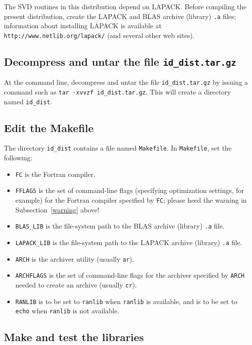 \documentclass[letterpaper,12pt]{article}
\begin{document}
The SVD routines in this distribution depend on LAPACK.
Before compiling the present distribution,
create the LAPACK and BLAS archive (library) {\tt .a} files;
information about installing LAPACK is available
at {\tt http://www.netlib.org/lapack/} (and several other web sites).


\subsection{Decompress and untar the file {\tt id\_dist.tar.gz}}

At the command line, decompress and untar the file
{\tt id\_dist.tar.gz} by issuing a command such as
{\tt tar -xvvzf id\_dist.tar.gz}.
This will create a directory named {\tt id\_dist}.


\subsection{Edit the Makefile}
\label{makefile_edit}

The directory {\tt id\_dist} contains a file named {\tt Makefile}.
In {\tt Makefile}, set the following:
%
\begin{itemize}
\item {\tt FC} is the Fortran compiler.
\item {\tt FFLAGS} is the set of command-line flags
      (specifying optimization settings, for example)
      for the Fortran compiler specified by {\tt FC};
      please heed the warning in Subsection~\ref{warning} above!
\item {\tt BLAS\_LIB} is the file-system path to the BLAS archive
      (library) {\tt .a} file.
\item {\tt LAPACK\_LIB} is the file-system path to the LAPACK archive
      (library) {\tt .a} file.
\item {\tt ARCH} is the archiver utility (usually {\tt ar}).
\item {\tt ARCHFLAGS} is the set of command-line flags
      for the archiver specified by {\tt ARCH} needed
      to create an archive (usually {\tt cr}).
\item {\tt RANLIB} is to be set to {\tt ranlib}
      when {\tt ranlib} is available, and is to be set to {\tt echo}
      when {\tt ranlib} is not available.
\end{itemize}


\subsection{Make and test the libraries}
\end{document}
